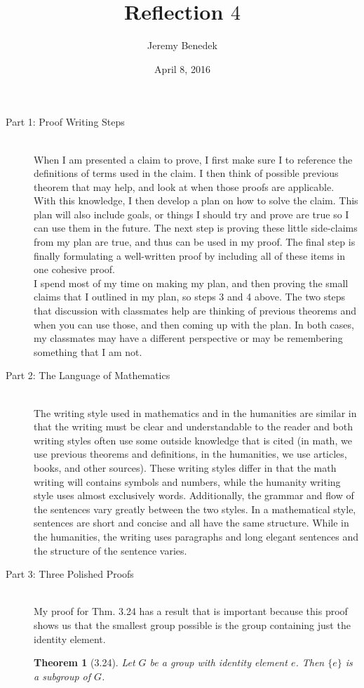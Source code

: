 \documentclass{article}
\title{Reflection $4$}
\author{Jeremy Benedek}
\date{April 8, 2016}
\newtheorem*{thm}{Theorem}
\begin{document}
\maketitle

\begin{description}
	\item[Part 1: Proof Writing Steps] \hfill \\
		When I am presented a claim to prove, I first make sure I 
		to reference the definitions of terms used in the claim. I then think of
		possible previous theorem that may help, and look at when those proofs are applicable.  
		With this knowledge, I then develop a plan on how to solve the claim. This plan will also include goals, or things I should
		try and prove are true so I can use them in the future. The next step is proving these little side-claims from my plan are true, and
		thus can be used in my proof. The final step is
		finally formulating a well-written proof by including all of these items in one cohesive proof.
		\\
		I spend most of my time on making my plan, and then proving the small claims that I outlined in my plan, so steps 3 and 4 above. 
		The two steps that discussion with classmates help are thinking of previous theorems and when  you can use those, and then coming
		up with the plan. In both cases, my classmates may have a different perspective or may be remembering something that I am not. 

	\item[Part 2: The Language of Mathematics] \hfil \\
		The writing style used in mathematics and in the humanities are similar in that the writing must be clear and understandable to
		the reader and both writing styles often use some
		outside knowledge that is cited (in math, we use previous theorems and definitions, in the humanities, we use articles, books, and
		other sources). These writing styles differ in that the math writing will contains symbols and numbers, while the humanity writing 
		style uses almost exclusively words. Additionally, the grammar and flow of the sentences vary greatly between the two styles. In a 
		mathematical style, sentences are short and concise and all have the same structure.
		While in the humanities, the writing uses paragraphs and long elegant sentences
		and the structure of the sentence varies. 

	\item[Part 3: Three Polished Proofs] \hfil \\
		My proof for Thm. 3.24 has a result that is important because this proof shows us that the smallest group possible is the group
		containing just the identity element. 
	  \begin{thm}[3.24]
	      	Let $G$ be a group with identity element $e$. Then $\{e\}$ is a subgroup of $G$. 


\end{thm}
\end{description}
\end{document}
